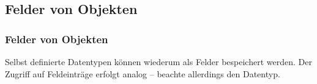\def\sstitle{Felder von Objekten}
\subsection{\sstitle}
\begin{frame}%
  \frametitle{\sstitle}%
Selbst definierte Datentypen k\"onnen wiederum als Felder bespeichert werden.
Der Zugriff auf Feldeintr\"age erfolgt analog -- beachte allerdings den Datentyp.

\end{frame}
